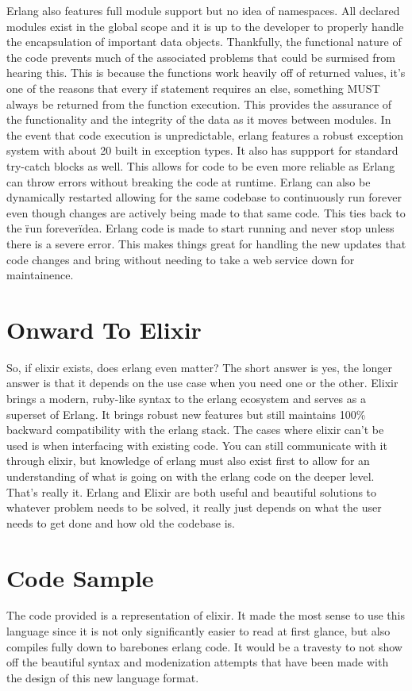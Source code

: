\documentclass[11pt]{article}
\begin{document}
Erlang also features full module support but no idea of namespaces. All declared modules exist in the global scope and it is up to the developer to properly handle the encapsulation of important data objects. Thankfully, the functional nature of the code prevents much of the associated problems that could be surmised from hearing this. This is because the functions work heavily off of returned values, it's one of the reasons that every if statement requires an else, something MUST always be returned from the function
execution. This provides the assurance of the functionality and the integrity of the data as it moves between modules. In the event that code execution is unpredictable, erlang features a robust exception system with about 20 built in exception types. It also
has suppport for standard try-catch blocks as well. This allows for code to be even more reliable as Erlang can throw errors without breaking the code at runtime. Erlang can also be dynamically restarted allowing for the same codebase to continuously run
forever even though changes are actively being made to that same code. This ties back to the \"run forever\" idea. Erlang code is made to start running and never stop unless there is a severe error. This makes things great for handling the new updates that code
changes and bring without needing to take a web service down for maintainence.

\section{Onward To Elixir}
So, if elixir exists, does erlang even matter? The short answer is yes, the longer answer is that it depends on the use case when you need one or the other. Elixir brings
a modern, ruby-like syntax to the erlang ecosystem and serves as a superset of Erlang. It brings robust new features but still maintains 100\% backward compatibility with
the erlang stack. The cases where elixir can't be used is when interfacing with existing code. You can still communicate with it through elixir, but knowledge of erlang
must also exist first to allow for an understanding of what is going on with the erlang code on the deeper level. That's really it. Erlang and Elixir are both useful and
beautiful solutions to whatever problem needs to be solved, it really just depends on what the user needs to get done and how old the codebase is.

\section{Code Sample}
The code provided is a representation of elixir. It made the most sense to use this language since it is not only significantly easier to read at first glance, but also compiles fully down to barebones
erlang code. It would be a travesty to not show off the beautiful syntax and modenization attempts that have been made with the design of this new language format.
\end{document}
